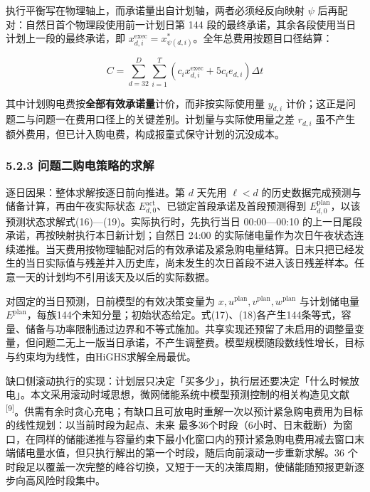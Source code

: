 \documentclass[12pt,a4paper]{ctexart}
\begin{document}
执行平衡写在物理轴上，而承诺量出自计划轴，两者必须经反向映射 $\psi$ 后再配对：自然日首个物理段使用前一计划日第 144 段的最终承诺，其余各段使用当日计划上一段的最终承诺，即 $x_{d,i}^{\mathrm{exec}}=x_{\psi(d,i)}^{*}$。全年总费用按题目口径结算：

\begin{equation}
C=\sum_{d=32}^{D}\sum_{i=1}^{T}\left(c_i x_{d,i}^{\mathrm{exec}}+5c_i e_{d,i}\right)\Delta t
\end{equation}

其中计划购电费按\textbf{全部有效承诺量}计价，而非按实际使用量 $y_{d,i}$ 计价；这正是问题二与问题一在费用口径上的关键差别。计划量与实际使用量之差 $r_{d,i}$ 虽不产生额外费用，但已计入购电费，构成报童式保守计划的沉没成本。

\subsubsection*{5.2.3 问题二购电策略的求解}

逐日因果：整体求解按逐日前向推进。第 $d$ 天先用 $\ell<d$ 的历史数据完成预测与储备计算，再由午夜实际状态 $E_{d,0}^{\mathrm{act}}$、已锁定首段承诺及首段预测得到 $E_{d,0}^{\mathrm{plan}}$，以该预测状态求解式(16)—(19)。实际执行时，先执行当日 00:00—00:10 的上一日尾段承诺，再按映射执行本日新计划；自然日 24:00 的实际储电量作为次日午夜状态连续递推。当天费用按物理轴配对后的有效承诺及紧急购电量结算。日末只把已经发生的当日实际值与残差并入历史库，尚未发生的次日首段不进入该日残差样本。任意一天的计划均不引用该天及以后的实际数据。

对固定的当日预测，日前模型的有效决策变量为 $x,u^{\mathrm{plan}},v^{\mathrm{plan}},w^{\mathrm{plan}}$ 与计划储电量 $E^{\mathrm{plan}}$，每族144个未知分量；初始状态给定。式(17)、(18)各产生144条等式，容量、储备与功率限制通过边界和不等式施加。共享实现还预留了未启用的调整量变量，但问题二无上一版当日承诺，不产生调整费。模型规模随段数线性增长，目标与约束均为线性，由HiGHS求解全局最优。

缺口侧滚动执行的实现：计划层只决定「买多少」，执行层还要决定「什么时候放电」。本文采用滚动时域思想，微网储能系统中模型预测控制的相关构造见文献\textsuperscript{[9]}。供需有余时贪心充电；有缺口且可放电时重解一次以预计紧急购电费用为目标的线性规划：以当前时段为起点、未来 最多36个时段（6小时、日末截断）为窗口，在同样的储能递推与容量约束下最小化窗口内的预计紧急购电费用减去窗口末端储电量水值，但只执行解出的第一个时段，随后向前滚动一步重新求解。36 个时段足以覆盖一次完整的峰谷切换，又短于一天的决策周期，使储能随预报更新逐步向高风险时段集中。
\end{document}
